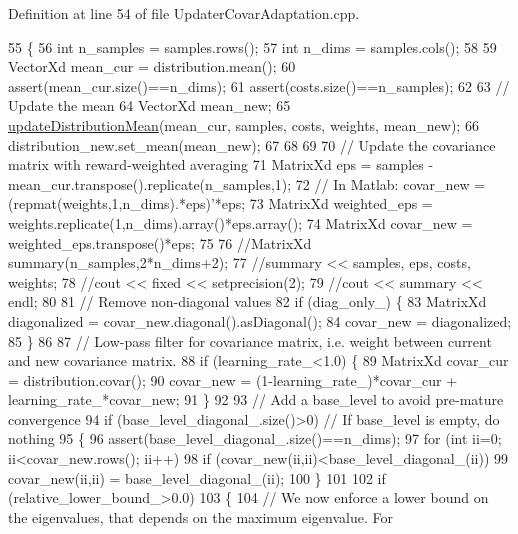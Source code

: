 Definition at line 54 of file Updater\+Covar\+Adaptation.\+cpp.


\begin{DoxyCode}
55 \{
56   \textcolor{keywordtype}{int} n\_samples = samples.rows();
57   \textcolor{keywordtype}{int} n\_dims = samples.cols();
58   
59   VectorXd mean\_cur = distribution.mean();
60   assert(mean\_cur.size()==n\_dims);
61   assert(costs.size()==n\_samples);
62   
63   \textcolor{comment}{// Update the mean}
64   VectorXd mean\_new;
65   \hyperlink{classDmpBbo_1_1UpdaterMean_a97c2ddfabeee67dba0044f405f4ce8c0}{updateDistributionMean}(mean\_cur, samples, costs, weights, mean\_new); 
66   distribution\_new.set\_mean(mean\_new);
67 
68   
69   
70   \textcolor{comment}{// Update the covariance matrix with reward-weighted averaging}
71   MatrixXd eps = samples - mean\_cur.transpose().replicate(n\_samples,1);
72   \textcolor{comment}{// In Matlab: covar\_new = (repmat(weights,1,n\_dims).*eps)'*eps;}
73   MatrixXd weighted\_eps = weights.replicate(1,n\_dims).array()*eps.array();
74   MatrixXd covar\_new = weighted\_eps.transpose()*eps;
75 
76   \textcolor{comment}{//MatrixXd summary(n\_samples,2*n\_dims+2);}
77   \textcolor{comment}{//summary << samples, eps, costs, weights;}
78   \textcolor{comment}{//cout << fixed << setprecision(2);}
79   \textcolor{comment}{//cout << summary << endl;}
80 
81   \textcolor{comment}{// Remove non-diagonal values}
82   \textcolor{keywordflow}{if} (diag\_only\_) \{
83     MatrixXd diagonalized = covar\_new.diagonal().asDiagonal();
84     covar\_new = diagonalized;    
85   \}
86   
87   \textcolor{comment}{// Low-pass filter for covariance matrix, i.e. weight between current and new covariance matrix.}
88   \textcolor{keywordflow}{if} (learning\_rate\_<1.0) \{
89     MatrixXd covar\_cur = distribution.covar();
90     covar\_new = (1-learning\_rate\_)*covar\_cur + learning\_rate\_*covar\_new;
91   \}
92   
93   \textcolor{comment}{// Add a base\_level to avoid pre-mature convergence}
94   \textcolor{keywordflow}{if} (base\_level\_diagonal\_.size()>0) \textcolor{comment}{// If base\_level is empty, do nothing}
95   \{
96     assert(base\_level\_diagonal\_.size()==n\_dims);
97     \textcolor{keywordflow}{for} (\textcolor{keywordtype}{int} ii=0; ii<covar\_new.rows(); ii++)
98       \textcolor{keywordflow}{if} (covar\_new(ii,ii)<base\_level\_diagonal\_(ii))
99         covar\_new(ii,ii) = base\_level\_diagonal\_(ii);
100   \}
101   
102   \textcolor{keywordflow}{if} (relative\_lower\_bound\_>0.0)
103   \{
104     \textcolor{comment}{// We now enforce a lower bound on the eigenvalues, that depends on the maximum eigenvalue. For}

\end{DoxyCode}
